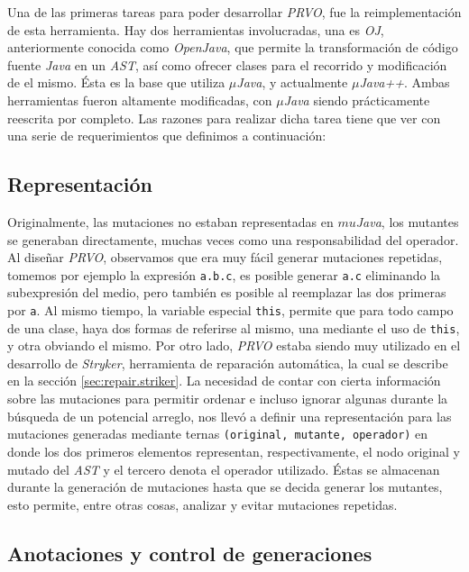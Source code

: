 Una de las primeras tareas para poder desarrollar \emph{PRVO}, fue la reimplementaci\'on de esta herramienta. Hay dos herramientas involucradas, una es \emph{OJ}, anteriormente conocida como \emph{OpenJava}, que permite la transformaci\'on de c\'odigo fuente \emph{Java} en un \emph{AST}, as\'i como ofrecer clases para el recorrido y modificaci\'on de el mismo. \'Esta es la base que utiliza \emph{$\mu$Java}, y actualmente \emph{$\mu$Java++}. Ambas herramientas fueron altamente modificadas, con \emph{$\mu$Java} siendo pr\'acticamente reescrita por completo. Las razones para realizar dicha tarea tiene que ver con una serie de requerimientos que definimos a continuaci\'on:

\subsection{Representaci\'on}

Originalmente, las mutaciones no estaban representadas en \emph{$mu$Java}, los mutantes se generaban directamente, muchas veces como una responsabilidad del operador. Al dise\~nar \emph{PRVO}, observamos que era muy f\'acil generar mutaciones repetidas, tomemos por ejemplo la expresi\'on \lstinline|a.b.c|, es posible generar \lstinline|a.c| eliminando la subexpresi\'on del medio, pero tambi\'en es posible al reemplazar las dos primeras por \lstinline|a|. Al mismo tiempo, la variable especial \lstinline|this|, permite que para todo campo de una clase, haya dos formas de referirse al mismo, una mediante el uso de \lstinline|this|, y otra obviando el mismo. Por otro lado, \emph{PRVO} estaba siendo muy utilizado en el desarrollo de \emph{Stryker}, herramienta de reparaci\'on autom\'atica, la cual se describe en la secci\'on \ref{sec:repair.striker}. La necesidad de contar con cierta informaci\'on sobre las mutaciones para permitir ordenar e incluso ignorar algunas durante la b\'usqueda de un potencial arreglo, nos llev\'o a definir una representaci\'on para las mutaciones generadas mediante ternas \texttt{(original, mutante, operador)} en donde los dos primeros elementos representan, respectivamente, el nodo original y mutado del \emph{AST} y el tercero denota el operador utilizado. \'Estas se almacenan durante la generaci\'on de mutaciones hasta que se decida generar los mutantes, esto permite, entre otras cosas, analizar y evitar mutaciones repetidas.

\subsection{Anotaciones y control de generaciones}

